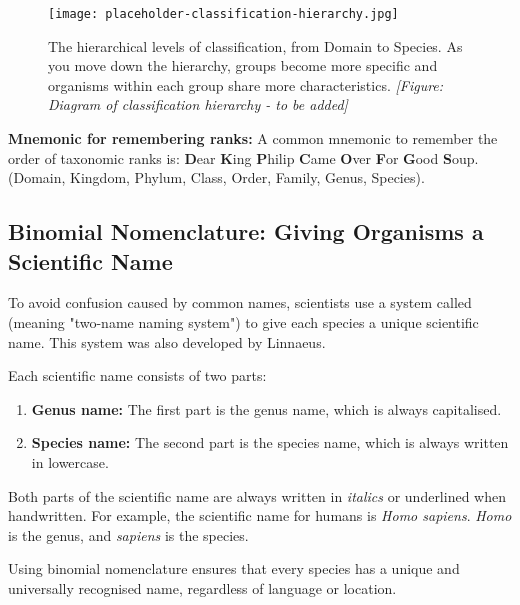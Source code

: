 \begin{figure}
\centering
\texttt{[image: placeholder-classification-hierarchy.jpg]}
\caption{The hierarchical levels of classification, from Domain to Species. As you move down the hierarchy, groups become more specific and organisms within each group share more characteristics. \textit{[Figure: Diagram of classification hierarchy - to be added]}}
\end{figure}

\begin{marginnote}
\textbf{Mnemonic for remembering ranks:}  A common mnemonic to remember the order of taxonomic ranks is: \textbf{D}ear \textbf{K}ing \textbf{P}hilip \textbf{C}ame \textbf{O}ver \textbf{F}or \textbf{G}ood \textbf{S}oup. (Domain, Kingdom, Phylum, Class, Order, Family, Genus, Species).
\end{marginnote}


\subsection{Binomial Nomenclature: Giving Organisms a Scientific Name}

To avoid confusion caused by common names, scientists use a system called  (meaning "two-name naming system") to give each species a unique scientific name. This system was also developed by Linnaeus.

Each scientific name consists of two parts:

\begin{enumerate}
    \item \textbf{Genus name:} The first part is the genus name, which is always capitalised.
    \item \textbf{Species name:} The second part is the species name, which is always written in lowercase.
\end{enumerate}

Both parts of the scientific name are always written in \textit{italics} or underlined when handwritten.  For example, the scientific name for humans is \textit{Homo sapiens}. \textit{Homo} is the genus, and \textit{sapiens} is the species.

Using binomial nomenclature ensures that every species has a unique and universally recognised name, regardless of language or location.

